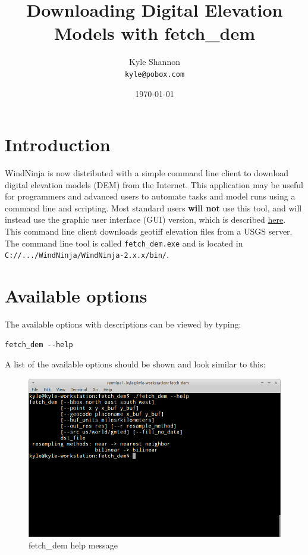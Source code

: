 \documentclass[12pt,oneside,final]{article}
\title{Downloading Digital Elevation Models with fetch\_dem}
\author{Kyle Shannon \\
\texttt{kyle@pobox.com}}
\date{\today}
\begin{document}
\maketitle

\section{Introduction}
WindNinja is now distributed with a simple command line client to download
digital elevation models (DEM) from the Internet.  This application may be
useful for programmers and advanced users to automate tasks and model runs using a
command line and scripting.
Most standard users \textbf{will not} use this tool, and will instead use the graphic
user interface (GUI) version, which is described
\href{run:./download_elevation_file.pdf}{here}.  This
command line client downloads geotiff elevation files from
a USGS server.  The command line tool is called \texttt{fetch\_dem.exe} and
is located in \texttt{C://.../WindNinja/WindNinja-2.x.x/bin/}.
\section{Available options}
The available options with descriptions can be viewed by typing:
\begin{verbatim}fetch_dem --help\end{verbatim}
A list of the available options should be shown and look similar to
this:
\begin{figure}[ht!]
    \centering
    \includegraphics[width=5in]{images/fetch_dem_1.png}
    \caption{fetch\_dem help message}
\end{figure}
\end{document}
